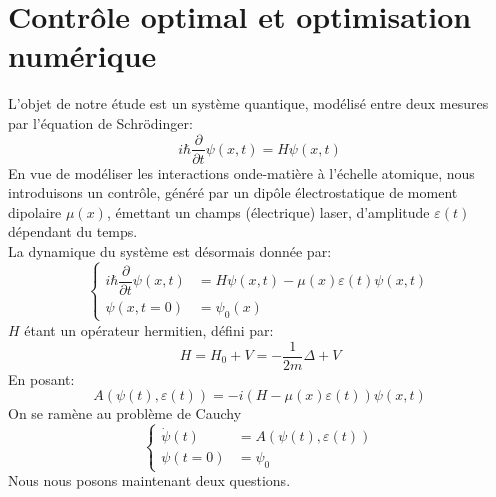 \section*{Contrôle optimal et optimisation numérique}
L'objet de notre étude est un système quantique, modélisé entre deux mesures par l'équation de Schrödinger:
\begin{equation} \label{schrodinger}
i \hbar \dfrac{\partial }{\partial t} \psi (x,t) = H\psi (x,t)
\end{equation}
En vue de modéliser les interactions onde-matière à l'échelle atomique, nous introduisons un contrôle, généré par un dipôle électrostatique de moment dipolaire $\mu (x)$, émettant un champs (électrique) laser, d'amplitude $\varepsilon (t)$ dépendant du temps.\\
La dynamique du système est désormais donnée par:
\begin{equation} \label{eq1}
\begin{cases}
i \hbar \dfrac{\partial }{\partial t} \psi (x,t) &= H\psi (x,t)-\mu(x)\varepsilon(t)\psi (x,t) \\
\psi (x,t=0) &= \psi_0(x)
\end{cases}
\end{equation}
$H$ étant un opérateur hermitien, défini par:
$$
H = H_0 + V = -\dfrac{1}{2m} \varDelta + V
$$
En posant:
\begin{equation}
A(\psi(t),\varepsilon(t))= -i(H-\mu(x)\varepsilon(t))\psi (x,t)
\end{equation}
On se ramène au problème de Cauchy
\begin{equation} \label{chauchy1}
\begin{cases}
\dot{\psi}(t) &= A(\psi(t),\varepsilon(t))\\
\psi (t=0) &= \psi_0
\end{cases}
\end{equation}
Nous nous posons maintenant deux questions.
